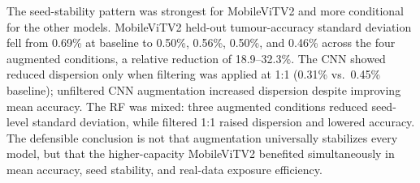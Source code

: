 \documentclass[conference,twoside]{IEEEtran}
\begin{document}
The seed-stability pattern was strongest for MobileViTV2 and more conditional for the other models. MobileViTV2 held-out tumour-accuracy standard deviation fell from 0.69\% at baseline to 0.50\%, 0.56\%, 0.50\%, and 0.46\% across the four augmented conditions, a relative reduction of 18.9--32.3\%. The CNN showed reduced dispersion only when filtering was applied at 1:1 (0.31\% vs.\ 0.45\% baseline); unfiltered CNN augmentation increased dispersion despite improving mean accuracy. The RF was mixed: three augmented conditions reduced seed-level standard deviation, while filtered 1:1 raised dispersion and lowered accuracy. The defensible conclusion is not that augmentation universally stabilizes every model, but that the higher-capacity MobileViTV2 benefited simultaneously in mean accuracy, seed stability, and real-data exposure efficiency.
\end{document}
